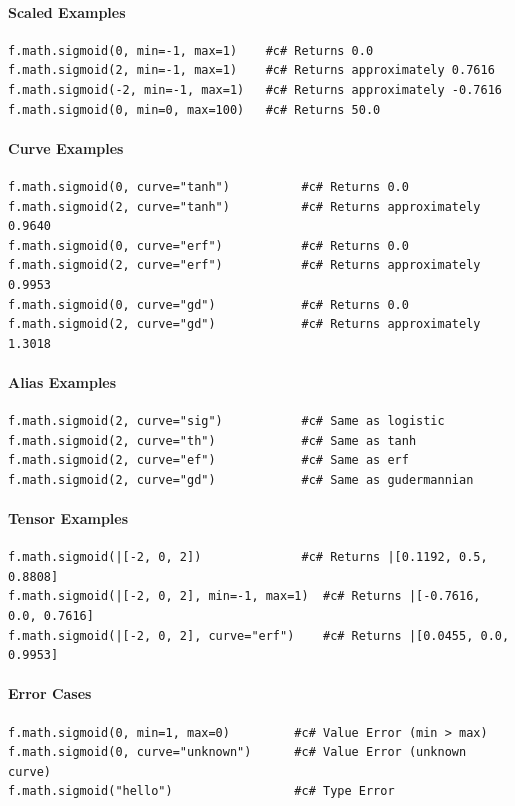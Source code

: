 \paragraph{Scaled Examples}
\begin{verbatim}
f.math.sigmoid(0, min=-1, max=1)    #c# Returns 0.0
f.math.sigmoid(2, min=-1, max=1)    #c# Returns approximately 0.7616
f.math.sigmoid(-2, min=-1, max=1)   #c# Returns approximately -0.7616
f.math.sigmoid(0, min=0, max=100)   #c# Returns 50.0
\end{verbatim}

\paragraph{Curve Examples}
\begin{verbatim}
f.math.sigmoid(0, curve="tanh")          #c# Returns 0.0
f.math.sigmoid(2, curve="tanh")          #c# Returns approximately 0.9640
f.math.sigmoid(0, curve="erf")           #c# Returns 0.0
f.math.sigmoid(2, curve="erf")           #c# Returns approximately 0.9953
f.math.sigmoid(0, curve="gd")            #c# Returns 0.0
f.math.sigmoid(2, curve="gd")            #c# Returns approximately 1.3018
\end{verbatim}

\paragraph{Alias Examples}
\begin{verbatim}
f.math.sigmoid(2, curve="sig")           #c# Same as logistic
f.math.sigmoid(2, curve="th")            #c# Same as tanh
f.math.sigmoid(2, curve="ef")            #c# Same as erf
f.math.sigmoid(2, curve="gd")            #c# Same as gudermannian
\end{verbatim}

\paragraph{Tensor Examples}
\begin{verbatim}
f.math.sigmoid(|[-2, 0, 2])              #c# Returns |[0.1192, 0.5, 0.8808]
f.math.sigmoid(|[-2, 0, 2], min=-1, max=1)  #c# Returns |[-0.7616, 0.0, 0.7616]
f.math.sigmoid(|[-2, 0, 2], curve="erf")    #c# Returns |[0.0455, 0.0, 0.9953]
\end{verbatim}

\paragraph{Error Cases}
\begin{verbatim}
f.math.sigmoid(0, min=1, max=0)         #c# Value Error (min > max)
f.math.sigmoid(0, curve="unknown")      #c# Value Error (unknown curve)
f.math.sigmoid("hello")                 #c# Type Error
\end{verbatim}

